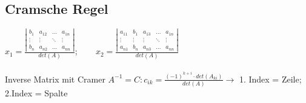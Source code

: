 \subsection{Cramsche Regel}
	$x_1= \frac{\left|\begin{array}{cccc}
		b_1 & a_{12} & \ldots & a_{1n} \\
		\vdots & \vdots & \ddots & \vdots \\
		b_n & a_{n2} & \ldots & a_{nn} \end{array}\right|}{det(A)}; \qquad
	x_2 = \frac{\left|\begin{array}{ccccc}
		a_{11} & b_1 & a_{13} & \ldots & a_{1n}\\
		\vdots & \vdots & \vdots & \ddots & \vdots \\
		a_{n1} & b_n & a_{n3} & \ldots & a_{nn} \end{array}\right|}{det(A)}$ \\ \\
Inverse Matrix mit Cramer $A^{-1} = C : c_{ik} = \frac{(-1)^{k+i} \cdot det(A_{ki})}{det(A)} \longrightarrow$ 1. Index = Zeile; 2.Index = Spalte















